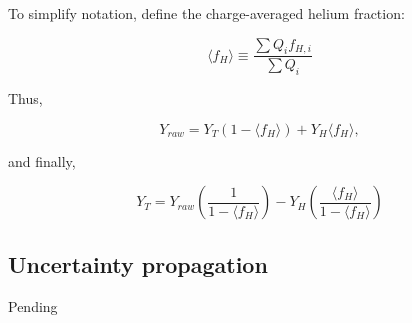 To simplify notation, define the charge-averaged helium fraction:

\begin{equation}
\langle f_H \rangle \equiv \frac{\sum Q_i f_{H,i}}{\sum Q_i}
\end{equation}

Thus,

\begin{equation}
Y_{raw} = Y_T(1-\langle f_H \rangle) + Y_H \langle f_H \rangle,
\end{equation}

and finally,

\begin{equation}
Y_T = Y_{raw}\left(\frac{1}{1-\langle f_H \rangle}\right) - Y_H \left(\frac{\langle f_H \rangle}{1-\langle f_H \rangle}\right)
\end{equation}

\subsection{Uncertainty propagation}

Pending

